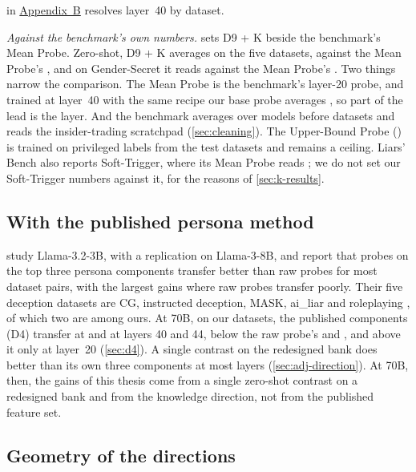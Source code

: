  in \hyperref[app:supplementary]{Appendix~B} resolves layer~40 by dataset.

\emph{Against the benchmark's own numbers.}  sets D9 + K beside the benchmark's
Mean Probe. Zero-shot, D9 + K averages  on the five datasets, against the Mean
Probe's , and on Gender-Secret it reads  against the Mean
Probe's . Two things narrow the comparison. The Mean Probe is the benchmark's
layer-20 probe, and trained at layer~40 with the same recipe our base probe averages
, so part of the lead is the layer. And the benchmark averages over models before
datasets and reads the insider-trading scratchpad (\cref{sec:cleaning}). The Upper-Bound Probe
() is trained on privileged labels from the test datasets and remains a ceiling.
Liars' Bench also reports Soft-Trigger, where its Mean Probe reads ; we do not
set our Soft-Trigger numbers against it, for the reasons of \cref{sec:k-results}.

\subsection{With the published persona method}
\label{sec:cmp-replication}

\textcite[p.~4]{mahadik2026persona} study Llama-3.2-3B, with a replication on Llama-3-8B, and report
that probes on the top three persona components transfer better than raw probes for most dataset
pairs, with the largest gains where raw probes transfer poorly. Their five deception datasets are CG,
instructed deception, MASK, ai\_liar and roleplaying \cite[p.~6]{mahadik2026persona}, of which two are
among ours. At 70B, on our datasets, the published components (D4) transfer at  and
 at layers 40 and 44, below the raw probe's  and ,
and above it only at layer~20 (\cref{sec:d4}). A single contrast on the redesigned bank does better
than its own three components at most layers (\cref{sec:adj-direction}). At 70B, then, the gains of
this thesis come from a single zero-shot contrast on a redesigned bank and from the knowledge
direction, not from the published feature set.

\subsection{Geometry of the directions}
\label{sec:cmp-geometry}

